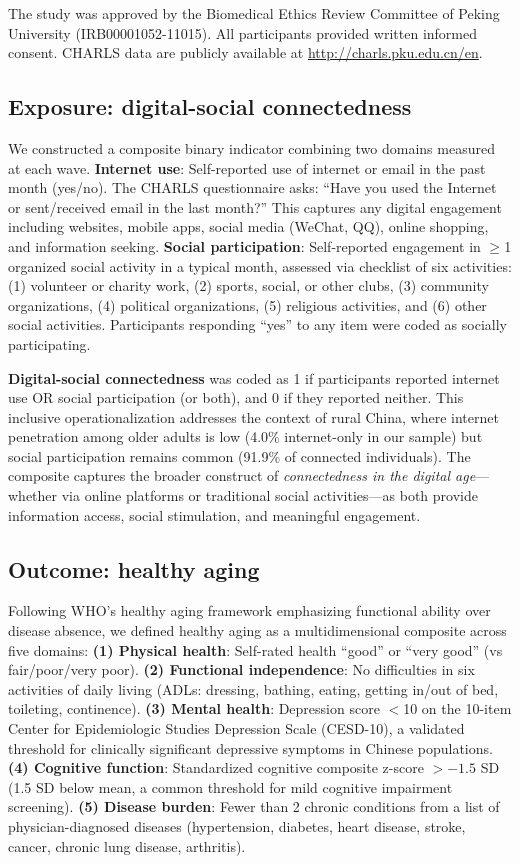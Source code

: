 \documentclass[10pt]{article}
\begin{document}
The study was approved by the Biomedical Ethics Review Committee of Peking University (IRB00001052-11015). All participants provided written informed consent. CHARLS data are publicly available at \url{http://charls.pku.edu.cn/en}.

\subsection*{Exposure: digital-social connectedness}

We constructed a composite binary indicator combining two domains measured at each wave. \textbf{Internet use}: Self-reported use of internet or email in the past month (yes/no). The CHARLS questionnaire asks: ``Have you used the Internet or sent/received email in the last month?'' This captures any digital engagement including websites, mobile apps, social media (WeChat, QQ), online shopping, and information seeking. \textbf{Social participation}: Self-reported engagement in $\geq$1 organized social activity in a typical month, assessed via checklist of six activities: (1) volunteer or charity work, (2) sports, social, or other clubs, (3) community organizations, (4) political organizations, (5) religious activities, and (6) other social activities. Participants responding ``yes'' to any item were coded as socially participating.

\textbf{Digital-social connectedness} was coded as 1 if participants reported internet use OR social participation (or both), and 0 if they reported neither. This inclusive operationalization addresses the context of rural China, where internet penetration among older adults is low (4.0\% internet-only in our sample) but social participation remains common (91.9\% of connected individuals). The composite captures the broader construct of \textit{connectedness in the digital age}---whether via online platforms or traditional social activities---as both provide information access, social stimulation, and meaningful engagement.

\subsection*{Outcome: healthy aging}

Following WHO's healthy aging framework emphasizing functional ability over disease absence, we defined healthy aging as a multidimensional composite across five domains: \textbf{(1) Physical health}: Self-rated health ``good'' or ``very good'' (vs fair/poor/very poor). \textbf{(2) Functional independence}: No difficulties in six activities of daily living (ADLs: dressing, bathing, eating, getting in/out of bed, toileting, continence). \textbf{(3) Mental health}: Depression score $<$10 on the 10-item Center for Epidemiologic Studies Depression Scale (CESD-10), a validated threshold for clinically significant depressive symptoms in Chinese populations. \textbf{(4) Cognitive function}: Standardized cognitive composite z-score $>-1.5$ SD (1.5 SD below mean, a common threshold for mild cognitive impairment screening). \textbf{(5) Disease burden}: Fewer than 2 chronic conditions from a list of physician-diagnosed diseases (hypertension, diabetes, heart disease, stroke, cancer, chronic lung disease, arthritis).
\end{document}
